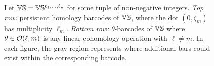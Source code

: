 

\begin{figure}
	\centering
	
	\caption{Let $\mathbb{V}\mathbb{S} = \mathbb{V}\mathbb{S}^{\ell_1,\dots,\ell_n}$ for some tuple of non-negative integers.
		\emph{Top row:} persistent homology barcodes of $\mathbb{V}\mathbb{S}$, where the dot $(0,\zeta_m)$ has multiplicity $\ell_m$.
		\emph{Bottom row:} $\theta$-barcodes of $\mathbb{V}\mathbb{S}$ where $\theta \in \mathcal{O}(\ell,m)$ is any linear cohomology operation with \(\ell \neq m\).
        In each figure, the gray region represents where additional bars could exist within the corresponding barcode.}
	\label{fig:barcodes_vs}
\end{figure}